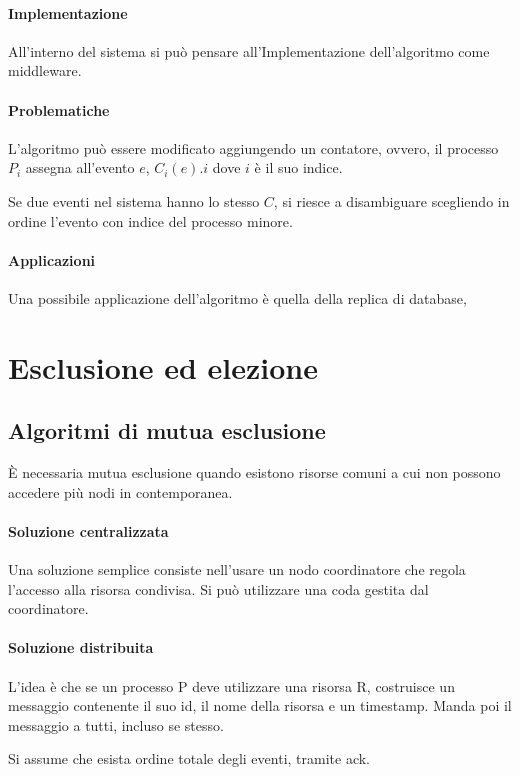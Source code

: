 \paragraph{Implementazione}
All'interno del sistema si può pensare all'Implementazione
dell'algoritmo come middleware.

\paragraph{Problematiche}
L'algoritmo può essere modificato aggiungendo un contatore, 
ovvero, il processo $P_i$ assegna all'evento 
$e$, $C_i(e).i$ dove $i$ è il suo indice.

Se due eventi nel sistema hanno lo stesso $C$, si riesce 
a disambiguare scegliendo in ordine l'evento con indice 
del processo minore.

\paragraph{Applicazioni}
Una possibile applicazione dell'algoritmo è quella 
della replica di database, 

\section{Esclusione ed elezione}
\subsection{Algoritmi di mutua esclusione}
\label{mutua}
È necessaria mutua esclusione quando esistono risorse 
comuni a cui non possono accedere più nodi in contemporanea.

\paragraph{Soluzione centralizzata}
Una soluzione semplice consiste nell'usare un nodo 
coordinatore che regola l'accesso alla risorsa 
condivisa. Si può utilizzare una coda gestita dal coordinatore.

\paragraph{Soluzione distribuita}
L'idea è che se un processo P deve utilizzare una risorsa
R, costruisce un messaggio contenente il suo id, il nome 
della risorsa e un timestamp. Manda poi il messaggio a tutti, 
incluso se stesso.

Si assume che esista ordine totale degli eventi, tramite 
ack.

